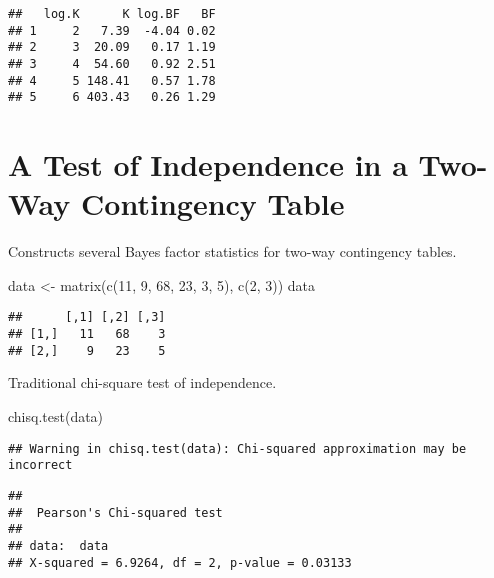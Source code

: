 \documentclass[
]{book}
\newenvironment{Shaded}{\begin{snugshade}}{\end{snugshade}}
\newcommand{\DecValTok}[1]{\textcolor[rgb]{0.00,0.00,0.81}{#1}}
\newcommand{\FunctionTok}[1]{\textcolor[rgb]{0.00,0.00,0.00}{#1}}
\newcommand{\NormalTok}[1]{#1}
\newcommand{\OtherTok}[1]{\textcolor[rgb]{0.56,0.35,0.01}{#1}}
\begin{document}
\begin{verbatim}
##   log.K      K log.BF   BF
## 1     2   7.39  -4.04 0.02
## 2     3  20.09   0.17 1.19
## 3     4  54.60   0.92 2.51
## 4     5 148.41   0.57 1.78
## 5     6 403.43   0.26 1.29
\end{verbatim}

\hypertarget{a-test-of-independence-in-a-two-way-contingency-table}{%
\section{A Test of Independence in a Two-Way Contingency Table}\label{a-test-of-independence-in-a-two-way-contingency-table}}

Constructs several Bayes factor statistics for two-way contingency tables.

\begin{Shaded}
\begin{Highlighting}[]
\NormalTok{data }\OtherTok{\textless{}{-}} \FunctionTok{matrix}\NormalTok{(}\FunctionTok{c}\NormalTok{(}\DecValTok{11}\NormalTok{, }\DecValTok{9}\NormalTok{, }\DecValTok{68}\NormalTok{, }\DecValTok{23}\NormalTok{, }\DecValTok{3}\NormalTok{, }\DecValTok{5}\NormalTok{),}
               \FunctionTok{c}\NormalTok{(}\DecValTok{2}\NormalTok{, }\DecValTok{3}\NormalTok{))}
\NormalTok{data}
\end{Highlighting}
\end{Shaded}

\begin{verbatim}
##      [,1] [,2] [,3]
## [1,]   11   68    3
## [2,]    9   23    5
\end{verbatim}

Traditional chi-square test of independence.

\begin{Shaded}
\begin{Highlighting}[]
\FunctionTok{chisq.test}\NormalTok{(data)}
\end{Highlighting}
\end{Shaded}

\begin{verbatim}
## Warning in chisq.test(data): Chi-squared approximation may be incorrect
\end{verbatim}

\begin{verbatim}
## 
##  Pearson's Chi-squared test
## 
## data:  data
## X-squared = 6.9264, df = 2, p-value = 0.03133
\end{verbatim}
\end{document}
